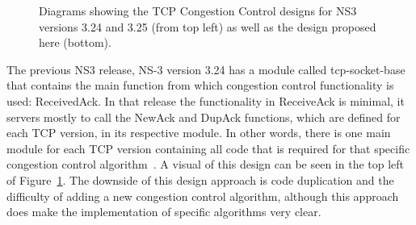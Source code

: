 \documentclass[conference]{IEEEtran}
\begin{document}
\begin{figure}[h!]
\begin{center}
\end{center}
\caption{Diagrams showing the TCP Congestion Control designs for NS3 versions 3.24 and 3.25 (from top left) as well as the design proposed here (bottom).}
\label{fig:design}
\end{figure}

The previous NS3 release, NS-3 version 3.24 has a module called tcp-socket-base that contains the main function from which congestion control functionality is used: ReceivedAck. In that release the functionality in ReceiveAck is minimal, it servers mostly to call the NewAck and DupAck functions, which are defined for each TCP version, in its respective module. In other words, there is one main module for each TCP version containing all code that is required for that specific congestion control algorithm~\cite{NS324Code}. A visual of this design can be seen in the top left of Figure~\ref{fig:design}. The downside of this design approach is code duplication and the difficulty of adding a new congestion control algorithm, although this approach does make the implementation of specific algorithms very clear. 
\end{document}
